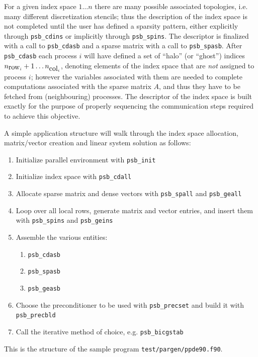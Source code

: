 For  a given index space $1\dots n$ there are many possible associated
topologies, i.e. many different discretization stencils; thus the
description of the index space is not completed until the user has
defined a sparsity pattern, either explicitly through \verb|psb_cdins|
or implicitly through \verb|psb_spins|. The descriptor is finalized
with a call to \verb|psb_cdasb| and a sparse matrix with a call to
\verb|psb_spasb|. After \verb|psb_cdasb| each process $i$ will have
defined a set of ``halo'' (or ``ghost'') indices
$n_{\hbox{row}_i}+1\dots n_{\hbox{col}_i}$, denoting elements of the index
space that are \emph{not} assigned to process $i$; however the
variables associated with them are needed to complete computations
associated with the sparse matrix $A$, and thus they have to be
fetched from (neighbouring) processes. The descriptor of the index
space is built exactly for the purpose of properly sequencing the
communication steps required to achieve this objective. 

A simple application structure will walk through the index space
allocation, matrix/vector creation and linear system solution as
follows:
\begin{enumerate}
\item Initialize parallel environment with \verb|psb_init|
\item Initialize index space with \verb|psb_cdall|
\item Allocate sparse matrix and dense vectors with \verb|psb_spall|
  and \verb|psb_geall|
\item Loop over all local rows, generate matrix and vector entries,
  and insert them with \verb|psb_spins| and \verb|psb_geins|
\item Assemble the various entities: 
\begin{enumerate}
\item \verb|psb_cdasb|
\item \verb|psb_spasb|
\item \verb|psb_geasb|
\end{enumerate}
\item Choose the preconditioner to be used with \verb|psb_precset| and
  build it with \verb|psb_precbld|
\item Call the iterative method of choice, e.g. \verb|psb_bicgstab|
\end{enumerate}
This is the structure of the sample program
\verb|test/pargen/ppde90.f90|. 

